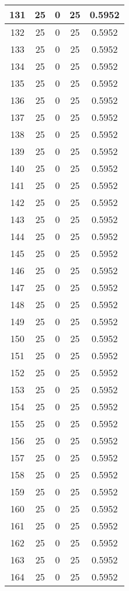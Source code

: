 \documentclass[letterpaper, 12pt]{article}
\begin{document}
\begin{longtable}{|c|c|c|c|c|}
\hline
131 & 25 & 0 & 25 & 0.5952 \\
\hline
132 & 25 & 0 & 25 & 0.5952 \\
\hline
133 & 25 & 0 & 25 & 0.5952 \\
\hline
134 & 25 & 0 & 25 & 0.5952 \\
\hline
135 & 25 & 0 & 25 & 0.5952 \\
\hline
136 & 25 & 0 & 25 & 0.5952 \\
\hline
137 & 25 & 0 & 25 & 0.5952 \\
\hline
138 & 25 & 0 & 25 & 0.5952 \\
\hline
139 & 25 & 0 & 25 & 0.5952 \\
\hline
140 & 25 & 0 & 25 & 0.5952 \\
\hline
141 & 25 & 0 & 25 & 0.5952 \\
\hline
142 & 25 & 0 & 25 & 0.5952 \\
\hline
143 & 25 & 0 & 25 & 0.5952 \\
\hline
144 & 25 & 0 & 25 & 0.5952 \\
\hline
145 & 25 & 0 & 25 & 0.5952 \\
\hline
146 & 25 & 0 & 25 & 0.5952 \\
\hline
147 & 25 & 0 & 25 & 0.5952 \\
\hline
148 & 25 & 0 & 25 & 0.5952 \\
\hline
149 & 25 & 0 & 25 & 0.5952 \\
\hline
150 & 25 & 0 & 25 & 0.5952 \\
\hline
151 & 25 & 0 & 25 & 0.5952 \\
\hline
152 & 25 & 0 & 25 & 0.5952 \\
\hline
153 & 25 & 0 & 25 & 0.5952 \\
\hline
154 & 25 & 0 & 25 & 0.5952 \\
\hline
155 & 25 & 0 & 25 & 0.5952 \\
\hline
156 & 25 & 0 & 25 & 0.5952 \\
\hline
157 & 25 & 0 & 25 & 0.5952 \\
\hline
158 & 25 & 0 & 25 & 0.5952 \\
\hline
159 & 25 & 0 & 25 & 0.5952 \\
\hline
160 & 25 & 0 & 25 & 0.5952 \\
\hline
161 & 25 & 0 & 25 & 0.5952 \\
\hline
162 & 25 & 0 & 25 & 0.5952 \\
\hline
163 & 25 & 0 & 25 & 0.5952 \\
\hline
164 & 25 & 0 & 25 & 0.5952 \\

\end{longtable}
\end{document}
